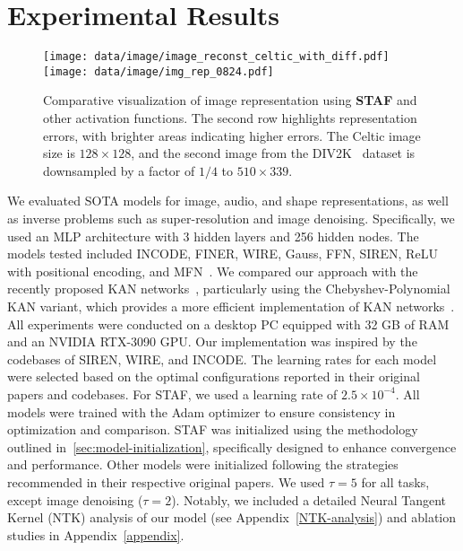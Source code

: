 \section{Experimental Results}
\begin{figure*}[t]
    \centering    
    \texttt{[image: data/image/image\_reconst\_celtic\_with\_diff.pdf]} \\
    \vspace{0.25em}
    \texttt{[image: data/image/img\_rep\_0824.pdf]}\\
    \vspace{-1em}
    \caption{Comparative visualization of image representation using \textbf{STAF} and other activation functions. The second row highlights representation errors, with brighter areas indicating higher errors. The Celtic image size is \(128 \times 128\), and the second image from the DIV2K~\citep{div2k} dataset is downsampled by a factor of \(1/4\) to \(510 \times 339\).}
    \label{fig:celtic}
\end{figure*}
We evaluated SOTA models for image, audio, and shape representations, as well as inverse problems such as super-resolution and image denoising. Specifically, we used an MLP architecture with 3 hidden layers and 256 hidden nodes. The models tested included INCODE, FINER, WIRE, Gauss, FFN, SIREN, ReLU with positional encoding, and MFN~\citep{kazerouni2024incode, liu2024finer, saragadam2023wire, ramasinghe2022beyond, Siren, tancik2020fourier, fathony2020multiplicative}. We compared our approach with the recently proposed KAN networks~\citep{liu2024kan}, particularly using the Chebyshev-Polynomial KAN variant, which provides a more efficient implementation of KAN networks~\citep{ss2024chebyshev}.  All experiments were conducted on a desktop PC equipped with 32 GB of RAM and an NVIDIA RTX-3090 GPU. Our implementation was inspired by the codebases of SIREN, WIRE, and INCODE. The learning rates for each model were selected based on the optimal configurations reported in their original papers and codebases. For STAF, we used a learning rate of \(2.5 \times 10^{-4}\). All models were trained with the Adam optimizer to ensure consistency in optimization and comparison. STAF was initialized using the methodology outlined in~\cref{sec:model-initialization}, specifically designed to enhance convergence and performance. Other models were initialized following the strategies recommended in their respective original papers. We used \(\tau = 5\) for all tasks, except image denoising (\(\tau = 2\)). Notably, we included a detailed Neural Tangent Kernel (NTK) analysis of our model (see Appendix~\ref{NTK-analysis}) and ablation studies in Appendix~\ref{appendix}.
